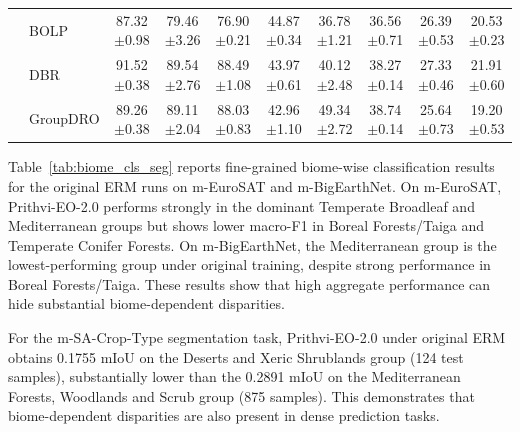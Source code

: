 \documentclass[10pt,twocolumn,letterpaper]{article}
\begin{document}
\begin{table}[t]
{\begin{tabular}{llcccccccc}
& BOLP & 87.32$\pm$0.98 & 79.46$\pm$3.26 & 76.90$\pm$0.21 & 44.87$\pm$0.34 & 36.78$\pm$1.21 & 36.56$\pm$0.71 & 26.39$\pm$0.53 & 20.53$\pm$0.23 \\
& DBR & 91.52$\pm$0.38 & 89.54$\pm$2.76 & 88.49$\pm$1.08 & 43.97$\pm$0.61 & 40.12$\pm$2.48 & 38.27$\pm$0.14 & 27.33$\pm$0.46 & 21.91$\pm$0.60 \\
& GroupDRO & 89.26$\pm$0.38 & 89.11$\pm$2.04 & 88.03$\pm$0.83 & 42.96$\pm$1.10 & 49.34$\pm$2.72 & 38.74$\pm$0.14 & 25.64$\pm$0.73 & 19.20$\pm$0.53 \\
\bottomrule
\end{tabular}%
}
\end{table}

Table~\ref{tab:biome_cls_seg} reports fine-grained biome-wise classification results for the original ERM runs on m-EuroSAT and m-BigEarthNet. On m-EuroSAT, Prithvi-EO-2.0 performs strongly in the dominant Temperate Broadleaf and Mediterranean groups but shows lower macro-F1 in Boreal Forests/Taiga and Temperate Conifer Forests. On m-BigEarthNet, the Mediterranean group is the lowest-performing group under original training, despite strong performance in Boreal Forests/Taiga. These results show that high aggregate performance can hide substantial biome-dependent disparities.




For the m-SA-Crop-Type segmentation task, Prithvi-EO-2.0 under original ERM obtains 0.1755 mIoU on the Deserts and Xeric Shrublands group (124 test samples), substantially lower than the 0.2891 mIoU on the Mediterranean Forests, Woodlands and Scrub group (875 samples). This demonstrates that biome-dependent disparities are also present in dense prediction tasks.
\end{document}
